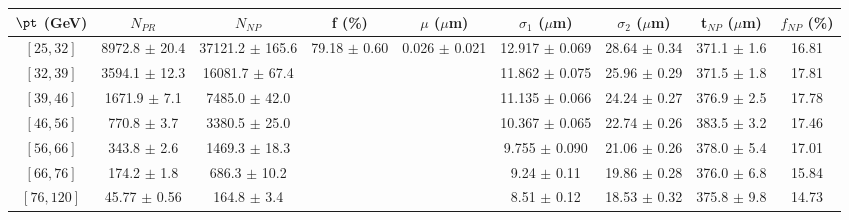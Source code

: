 \begin{tabular}{c||c|c|c|c|c|c|c||c}
$\pt$ (GeV) & $N_{PR}$ & $N_{NP}$ & f (\%) & $\mu$ ($\mu$m) & $\sigma_1$ ($\mu$m) & $\sigma_2$ ($\mu$m)  & t$_{NP}$ ($\mu$m) & $f_{NP}$ (\%) \\
\hline
$[25, 32]$ & 8972.8 $\pm$ 20.4 & 37121.2 $\pm$ 165.6 & \multirow{7}{*}{79.18 $\pm$ 0.60} & \multirow{7}{*}{0.026 $\pm$ 0.021} & 12.917 $\pm$ 0.069 & 28.64 $\pm$ 0.34 & 371.1 $\pm$ 1.6 & 16.81\\
$[32, 39]$ & 3594.1 $\pm$ 12.3 & 16081.7 $\pm$ 67.4 &  &  & 11.862 $\pm$ 0.075 & 25.96 $\pm$ 0.29 & 371.5 $\pm$ 1.8 & 17.81\\
$[39, 46]$ & 1671.9 $\pm$ 7.1 & 7485.0 $\pm$ 42.0 &  &  & 11.135 $\pm$ 0.066 & 24.24 $\pm$ 0.27 & 376.9 $\pm$ 2.5 & 17.78\\
$[46, 56]$ & 770.8 $\pm$ 3.7 & 3380.5 $\pm$ 25.0 &  &  & 10.367 $\pm$ 0.065 & 22.74 $\pm$ 0.26 & 383.5 $\pm$ 3.2 & 17.46\\
$[56, 66]$ & 343.8 $\pm$ 2.6 & 1469.3 $\pm$ 18.3 &  &  & 9.755 $\pm$ 0.090 & 21.06 $\pm$ 0.26 & 378.0 $\pm$ 5.4 & 17.01\\
$[66, 76]$ & 174.2 $\pm$ 1.8 & 686.3 $\pm$ 10.2 &  &  & 9.24 $\pm$ 0.11 & 19.86 $\pm$ 0.28 & 376.0 $\pm$ 6.8 & 15.84\\
$[76, 120]$ & 45.77 $\pm$ 0.56 & 164.8 $\pm$ 3.4 &  &  & 8.51 $\pm$ 0.12 & 18.53 $\pm$ 0.32 & 375.8 $\pm$ 9.8 & 14.73\\
\end{tabular}
